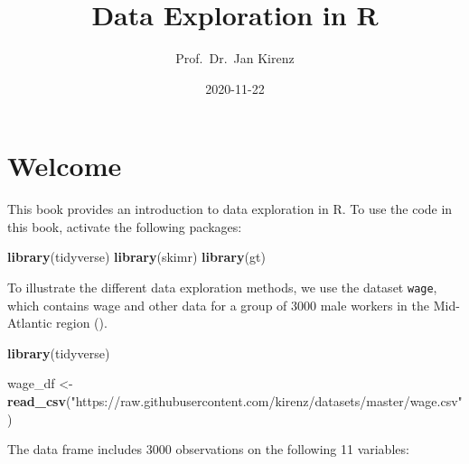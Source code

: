 \documentclass[
]{book}
\title{Data Exploration in R}
\author{Prof.~Dr.~Jan Kirenz}
\date{2020-11-22}
\newenvironment{Shaded}{\begin{snugshade}}{\end{snugshade}}
\newcommand{\KeywordTok}[1]{\textcolor[rgb]{0.13,0.29,0.53}{\textbf{#1}}}
\newcommand{\NormalTok}[1]{#1}
\newcommand{\StringTok}[1]{\textcolor[rgb]{0.31,0.60,0.02}{#1}}
\begin{document}
\maketitle

{
\setcounter{tocdepth}{1}
\tableofcontents
}
\hypertarget{welcome}{%
\chapter*{Welcome}\label{welcome}}

This book provides an introduction to data exploration in R. To use the code in this book, activate the following packages:

\begin{Shaded}
\begin{Highlighting}[]
\KeywordTok{library}\NormalTok{(tidyverse)}
\KeywordTok{library}\NormalTok{(skimr)}
\KeywordTok{library}\NormalTok{(gt)}
\end{Highlighting}
\end{Shaded}

To illustrate the different data exploration methods, we use the dataset \texttt{wage}, which contains wage and other data for a group of 3000 male workers in the Mid-Atlantic region (\citet{James2000}).

\begin{Shaded}
\begin{Highlighting}[]
\KeywordTok{library}\NormalTok{(tidyverse)}

\NormalTok{wage\_df \textless{}{-}}\StringTok{ }\KeywordTok{read\_csv}\NormalTok{(}\StringTok{"https://raw.githubusercontent.com/kirenz/datasets/master/wage.csv"}\NormalTok{)}
\end{Highlighting}
\end{Shaded}

The data frame includes 3000 observations on the following 11 variables:
\end{document}
